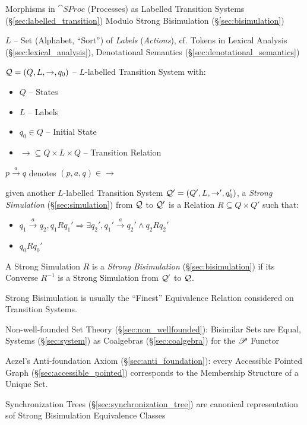 \asterism


Morphisms in $\cat{SProc}$ (Processes) as Labelled Transition Systems
(\S\ref{sec:labelled_transition}) Modulo Strong Bisimulation
(\S\ref{sec:bisimulation})

$L$ -- Set (Alphabet, ``Sort'') of \emph{Labels} (\emph{Actions}), cf.
Tokens in Lexical Analysis (\S\ref{sec:lexical_analysis}),
Denotational Semantics (\S\ref{sec:denotational_semantics})

$\mathcal{Q} = (Q,L,\rightarrow,q_0)$ -- $L$-labelled Transition System
 with:
\begin{itemize}
  \item $Q$ -- States
  \item $L$ -- Labels
  \item $q_0 \in Q$ -- Initial State
  \item $\rightarrow \subseteq Q \times L \times Q$ -- Transition
    Relation
\end{itemize}

$p \xrightarrow{a} q$ denotes $(p,a,q) \in \rightarrow$

given another $L$-labelled Transition System $\mathcal{Q}' =
(Q',L,\rightarrow',q_0')$, a \emph{Strong Simulation}
(\S\ref{sec:simulation}) from $\mathcal{Q}$ to $\mathcal{Q}'$ is a
Relation $R \subseteq Q \times Q'$ such that:
\begin{itemize}
  \item $q_1 \xrightarrow{a} q_2, q_1 R q_1' \Rightarrow
    \exists q_2', q_1' \xrightarrow{a} q_2' \wedge q_2 R q_2'$
  \item $q_0 R q_0'$
\end{itemize}

A Strong Simulation $R$ is a \emph{Strong Bisimulation}
(\S\ref{sec:bisimulation}) if its Converse $R^{-1}$ is a Strong
Simulation from $\mathcal{Q}'$ to $\mathcal{Q}$.

Strong Bisimulation is usually the ``Finest'' Equivalence Relation
considered on Transition Systems.

Non-well-founded Set Theory (\S\ref{sec:non_wellfounded}): Bisimilar
Sets are Equal, Systems (\S\ref{sec:system}) as Coalgebras
(\S\ref{sec:coalgebra}) for the $\mathscr{P}$ Functor

Aczel's Anti-foundation Axiom (\S\ref{sec:anti_foundation}): every
Accessible Pointed Graph (\S\ref{sec:accessible_pointed}) corresponds
to the Membership Structure of a Unique Set.

Synchronization Trees (\S\ref{sec:synchronization_tree}) are canonical
representation sof Strong Bisimulation Equivalence Classes


